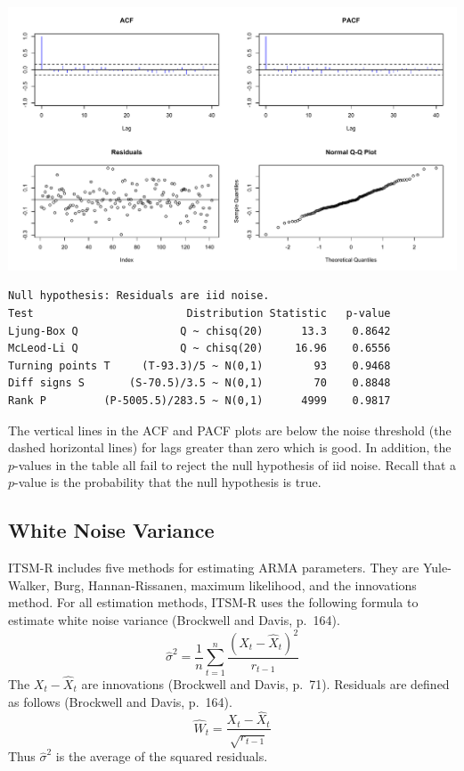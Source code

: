 \documentclass[11pt]{article}
\begin{document}
\begin{center}
\includegraphics[scale=0.3]{Rplot-6.pdf}
\end{center}

\begin{verbatim}
Null hypothesis: Residuals are iid noise.
Test                        Distribution Statistic   p-value
Ljung-Box Q                Q ~ chisq(20)      13.3    0.8642
McLeod-Li Q                Q ~ chisq(20)     16.96    0.6556
Turning points T     (T-93.3)/5 ~ N(0,1)        93    0.9468
Diff signs S       (S-70.5)/3.5 ~ N(0,1)        70    0.8848
Rank P         (P-5005.5)/283.5 ~ N(0,1)      4999    0.9817
\end{verbatim}

The vertical lines in the ACF and PACF plots are below the noise threshold
(the dashed horizontal lines)
for lags greater than zero which is good.
In addition, the $p$-values in the table all fail to reject the null hypothesis
of iid noise.
Recall that a $p$-value is the probability that the null hypothesis is true.

\subsection{White Noise Variance}

ITSM-R includes five methods for estimating ARMA parameters.
They are Yule-Walker, Burg, Hannan-Rissanen, maximum likelihood,
and the innovations method.
For all estimation methods, ITSM-R uses
the following formula to estimate white noise variance
(Brockwell and Davis, p.~164).
\[
\hat\sigma^2=\frac{1}{n}\sum_{t=1}^n\frac{(X_t-\hat X_t)^2}{r_{t-1}}
\]
The $X_t-\hat X_t$ are innovations (Brockwell and Davis, p.~71).
Residuals are defined as follows (Brockwell and Davis, p.~164).
\[
\hat W_t=\frac{X_t-\hat X_t}{\sqrt{r_{t-1}}}
\]
Thus $\hat\sigma^2$ is the average of the squared residuals.
\end{document}
